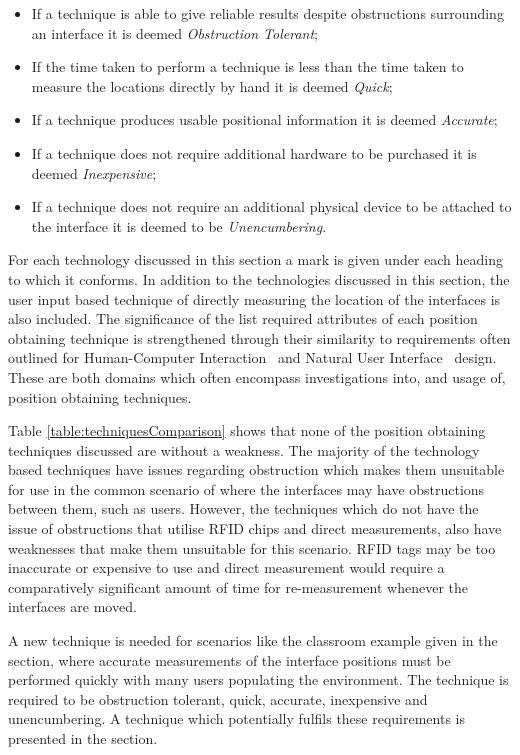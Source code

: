 \documentclass{bmcart}
\begin{document}
\begin{itemize}
  \item If a technique is able to give reliable results despite obstructions surrounding an interface it is deemed {\emph{Obstruction Tolerant}};
  \item If the time taken to perform a technique is less than the time taken to measure the locations directly by hand it is deemed {\emph{Quick}};
  \item If a technique produces usable positional information it is deemed {\emph{Accurate}};
  \item If a technique does not require additional hardware to be purchased it is deemed {\emph{Inexpensive}};
  \item If a technique does not require an additional physical device to be attached to the interface it is deemed to be {\emph{Unencumbering}}.
\end{itemize}

For each technology discussed in this section a mark is given under each heading to which it conforms.
In addition to the technologies discussed in this section, the user input based technique of directly measuring the location of the interfaces is also included.
The significance of the list required attributes of each position obtaining technique is strengthened through their similarity to requirements often outlined for Human-Computer Interaction~\cite{Jacob1993} and Natural User Interface~\cite{Dietz2001} design.
These are both domains which often encompass investigations into, and usage of, position obtaining techniques.

Table \ref{table:techniquesComparison} shows that none of the position obtaining techniques discussed are without a weakness.
The majority of the technology based techniques have issues regarding obstruction which makes them unsuitable for use in the common scenario of where the interfaces may have obstructions between them, such as users.
However, the techniques which do not have the issue of obstructions that utilise RFID chips and direct measurements, also have weaknesses that make them unsuitable for this scenario.
RFID tags may be too inaccurate or expensive to use and direct measurement would require a comparatively significant amount of time for re-measurement whenever the interfaces are moved.

A new technique is needed for scenarios like the classroom example given in the  section, where accurate measurements of the interface positions must be performed quickly with many users populating the environment.
The technique is required to be obstruction tolerant, quick, accurate, inexpensive and unencumbering.
A technique  which potentially fulfils these requirements is presented in the  section.
\end{document}
